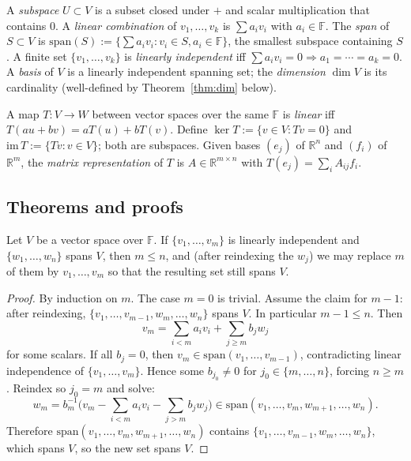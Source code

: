 \begin{definition}
A \emph{subspace} $U\subset V$ is a subset closed under $+$ and scalar multiplication that contains $0$. A \emph{linear combination} of $v_1,\dots,v_k$ is $\sum a_i v_i$ with $a_i\in\mathbb{F}$. The \emph{span} of $S\subset V$ is $\mathrm{span}(S) := \{\sum a_iv_i : v_i\in S, a_i\in\mathbb{F}\}$, the smallest subspace containing $S$. A finite set $\{v_1,\dots,v_k\}$ is \emph{linearly independent} iff $\sum a_i v_i = 0 \Rightarrow a_1=\cdots=a_k=0$. A \emph{basis} of $V$ is a linearly independent spanning set; the \emph{dimension} $\dim V$ is its cardinality (well-defined by Theorem~\ref{thm:dim} below).
\end{definition}

\begin{definition}
A map $T\colon V\to W$ between vector spaces over the same $\mathbb{F}$ is \emph{linear} iff $T(au+bv) = aT(u)+bT(v)$. Define $\ker T := \{v\in V: Tv = 0\}$ and $\mathrm{im}\,T := \{Tv : v\in V\}$; both are subspaces. Given bases $(e_j)$ of $\mathbb{R}^n$ and $(f_i)$ of $\mathbb{R}^m$, the \emph{matrix representation} of $T$ is $A\in\mathbb{R}^{m\times n}$ with $T(e_j) = \sum_i A_{ij} f_i$.
\end{definition}

\subsection*{Theorems and proofs}

\begin{lemma}\label{lem:steinitz}
Let $V$ be a vector space over $\mathbb{F}$. If $\{v_1,\dots,v_m\}$ is linearly independent and $\{w_1,\dots,w_n\}$ spans $V$, then $m\le n$, and (after reindexing the $w_j$) we may replace $m$ of them by $v_1,\dots,v_m$ so that the resulting set still spans $V$.
\end{lemma}

\begin{proof}
By induction on $m$. The case $m=0$ is trivial. Assume the claim for $m-1$: after reindexing, $\{v_1,\dots,v_{m-1},w_m,\dots,w_n\}$ spans $V$. In particular $m-1\le n$. Then
\[
v_m = \sum_{i<m} a_i v_i + \sum_{j\ge m} b_j w_j
\]
for some scalars. If all $b_j = 0$, then $v_m\in\mathrm{span}(v_1,\dots,v_{m-1})$, contradicting linear independence of $\{v_1,\dots,v_m\}$. Hence some $b_{j_0}\ne 0$ for $j_0\in\{m,\dots,n\}$, forcing $n\ge m$. Reindex so $j_0=m$ and solve:
\[
w_m = b_m^{-1}\!\Big(v_m - \sum_{i<m} a_i v_i - \sum_{j>m} b_j w_j\Big) \in \mathrm{span}(v_1,\dots,v_m,w_{m+1},\dots,w_n).
\]
Therefore $\mathrm{span}(v_1,\dots,v_m,w_{m+1},\dots,w_n)$ contains $\{v_1,\dots,v_{m-1},w_m,\dots,w_n\}$, which spans $V$, so the new set spans $V$.
\end{proof}

